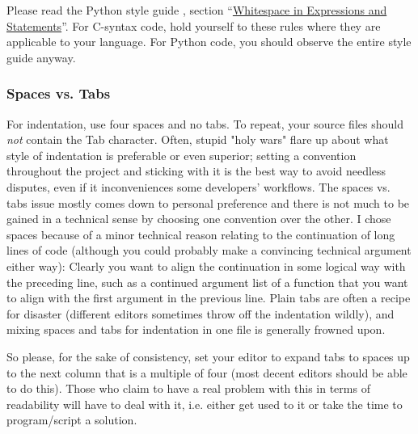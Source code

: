 \documentclass[12pt]{article}
\begin{document}
Please read the Python style guide \cite{pyguide}, section ``\href{http://www.python.org/dev/peps/pep-0008/#whitespace-in-expressions-and-statements}{Whitespace in Expressions and Statements}''. For C-syntax code, hold yourself to these rules where they are applicable to your language. For Python code, you should observe the entire style guide anyway.

\subsubsection{Spaces vs. Tabs}
For indentation, use four spaces and no tabs. To repeat, your source files should \emph{not} contain the Tab character. Often, stupid "holy wars" flare up about what style of indentation is preferable or even superior; setting a convention throughout the project and sticking with it is the best way to avoid needless disputes, even if it inconveniences some developers' workflows. The spaces vs. tabs issue mostly comes down to personal preference and there is not much to be gained in a technical sense by choosing one convention over the other. I chose spaces because of a minor technical reason relating to the continuation of long lines of code (although you could probably make a convincing technical argument either way): Clearly you want to align the continuation in some logical way with the preceding line, such as a continued argument list of a function that you want to align with the first argument in the previous line. Plain tabs are often a recipe for disaster (different editors sometimes throw off the indentation wildly), and mixing spaces and tabs for indentation in one file is generally frowned upon.

So please, for the sake of consistency, set your editor to expand tabs to spaces up to the next column that is a multiple of four (most decent editors should be able to do this). Those who claim to have a real problem with this in terms of readability will have to deal with it, i.e. either get used to it or take the time to program/script a solution.
\end{document}
